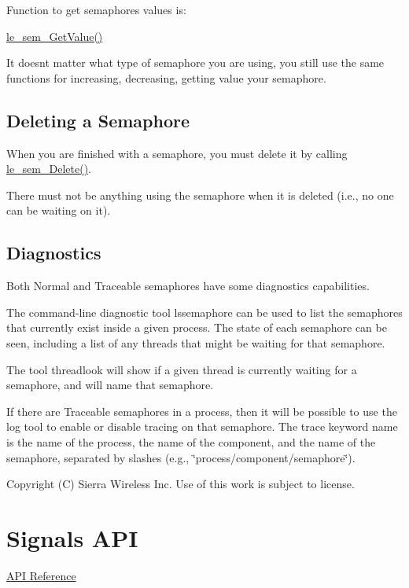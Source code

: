 Function to get semaphores values is\+:
\begin{DoxyItemize}
\item {\ttfamily \hyperlink{le__semaphore_8h_ac4858ccb0ba748ca463bb29807b75c05}{le\+\_\+sem\+\_\+\+Get\+Value()}} 
\end{DoxyItemize}

It doesn\textquotesingle{}t matter what type of semaphore you are using, you still use the same functions for increasing, decreasing, getting value your semaphore.\hypertarget{c_semaphore_delete_semaphore}{}\subsection{Deleting a Semaphore}\label{c_semaphore_delete_semaphore}
When you are finished with a semaphore, you must delete it by calling \hyperlink{le__semaphore_8h_a96361b126f59934354ca17bf8b74b8f6}{le\+\_\+sem\+\_\+\+Delete()}.

There must not be anything using the semaphore when it is deleted (i.\+e., no one can be waiting on it).\hypertarget{c_semaphore_diagnostics_semaphore}{}\subsection{Diagnostics}\label{c_semaphore_diagnostics_semaphore}
Both Normal and Traceable semaphores have some diagnostics capabilities.

The command-\/line diagnostic tool lssemaphore can be used to list the semaphores that currently exist inside a given process. The state of each semaphore can be seen, including a list of any threads that might be waiting for that semaphore.

The tool threadlook will show if a given thread is currently waiting for a semaphore, and will name that semaphore.

If there are Traceable semaphores in a process, then it will be possible to use the log tool to enable or disable tracing on that semaphore. The trace keyword name is the name of the process, the name of the component, and the name of the semaphore, separated by slashes (e.\+g., \char`\"{}process/component/semaphore\char`\"{}).





Copyright (C) Sierra Wireless Inc. Use of this work is subject to license. \hypertarget{c_signals}{}\section{Signals A\+P\+I}\label{c_signals}
\hyperlink{le__signals_8h}{A\+P\+I Reference}





